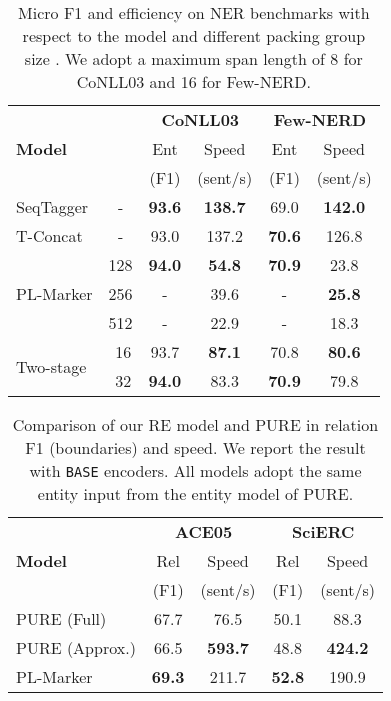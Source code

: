 \documentclass[11pt]{article}
\newcommand\Ourmodel{PL-Marker\xspace}
\begin{document}
\begin{table}[!t]
\small
\centering
\begin{tabular}{l|c|cc|cc}
\toprule
\multirow{3}{*}{\textbf{Model}} & \multirow{3}{*}{{}}  & \multicolumn{2}{c|}{\textbf{CoNLL03}} & \multicolumn{2}{c}{\textbf{Few-NERD}} \\
&& Ent & Speed & Ent & Speed \\
&& (F1) & (sent/s) & (F1) & (sent/s) \\ \midrule
SeqTagger & - & \textbf{93.6}& \textbf{138.7} & 69.0 & \textbf{142.0} \\
T-Concat & - &93.0 & 137.2 & \textbf{70.6} & 126.8 \\   
\midrule
\multirow{3}{*}{{\Ourmodel}} 
& 128 & \textbf{94.0}& \textbf{54.8} & \textbf{70.9}  &  23.8 \\     
& 256 &-& 39.6 & - & \textbf{25.8} \\   
& 512 &-& 22.9  & - & {18.3}\\
\midrule
\multirow{2}{*}{{Two-stage}} 
& \,\,16 & 93.7 & \textbf{87.1} & 70.8  & \textbf{80.6} \\ & \,\,32 & \textbf{94.0} & 83.3 &   \textbf{70.9} & 79.8\\ \bottomrule
\end{tabular}
 \caption{Micro F1 and efficiency on NER benchmarks with respect to the model and  different packing group size .  We adopt a maximum span length of 8 for CoNLL03 and 16 for Few-NERD. }

 \label{tab:nerspeed}


\end{table}

\begin{table}[!t]
\small
\centering
\begin{tabular}{l|cc|cc}
\toprule
\multirow{3}{*}{\textbf{Model}} & \multicolumn{2}{c|}{\textbf{ACE05}} & \multicolumn{2}{c}{\textbf{SciERC}} \\
& Rel & Speed & Rel & Speed \\
& (F1) & (sent/s) & (F1) & (sent/s) \\
\midrule
PURE (Full) & 67.7 &  76.5 & 50.1 &  88.3 \\
PURE (Approx.)& 66.5 & \textbf{593.7} &48.8 & \textbf{424.2}  \\
\Ourmodel &  \textbf{69.3} & 211.7  & \textbf{52.8}  & 190.9 \\
\bottomrule
\end{tabular}
 \caption{Comparison of our RE model and  PURE in relation F1 (boundaries) and speed. We report the result with \texttt{BASE} encoders. All models adopt the same entity input from the entity model of PURE. 
}

 \label{tab:respeed}


\end{table}
\end{document}
